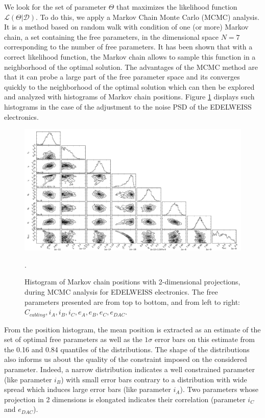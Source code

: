 We look for the set of parameter $\Theta$ that maximizes the likelihood function $\mathcal{L}(\Theta | \mathcal{D})$. To do this, we apply a Markov Chain Monte Carlo (MCMC) analysis. It is a method based on random walk with condition of one (or more) Markov chain, a set containing the free parameters, in the dimensional space $N=7$ corresponding to the number of free parameters. It has been shown that with a correct likelihood function, the Markov chain allows to sample this function in a neighborhood of the optimal solution. The advantages of the MCMC method are that it can probe a large part of the free parameter space and its converges quickly to the neighborhood of the optimal solution which can then be explored and analyzed with histograms of Markov chain positions. Figure \ref{fig:triangle-mcmc} displays such histograms in the case of the adjustment to the noise PSD of the EDELWEISS electronics.
\begin{figure}
\includegraphics [width=\textwidth]{Figures/Ethem/triangle_fin.pdf}
\caption{Histogram of Markov chain positions with 2-dimensional projections, during MCMC analysis for EDELWEISS electronics. The free parameters presented are from top to bottom, and from left to right: $C_{cabling}, i_A, i_B, i_C, e_A, e_B, e_C, e_{DAC}$.}.
\label{fig:triangle-mcmc}
\end{figure}
From the position histogram, the mean position is extracted as an estimate of the set of optimal free parameters as well as the $1\sigma$ error bars on this estimate from the 0.16 and 0.84 quantiles of the distributions. The shape of the distributions also informs us about the quality of the constraint imposed on the considered parameter. Indeed, a narrow distribution indicates a well constrained parameter (like parameter $i_B$) with small error bars contrary to a distribution with wide spread which induces large error bars (like parameter $i_A$). Two parameters whose projection in 2 dimensions is elongated indicates their correlation (parameter $i_C$ and $e_{DAC}$).

